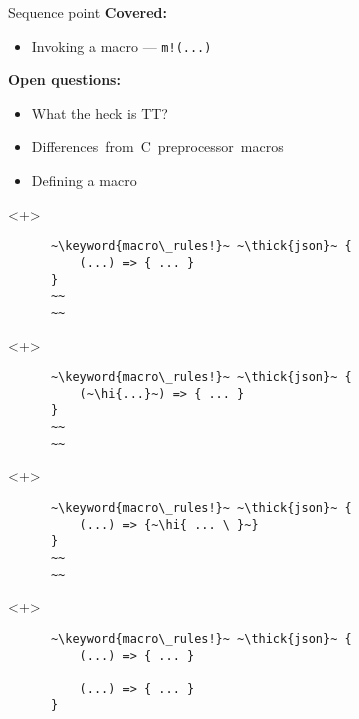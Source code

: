 \documentclass[usepdftitle=false]{beamer}
\newcommand{\thick}[1]{\contourlength{0.16pt}\contour[10]{black}{#1}}
\newcommand{\hi}[1]{%
\tikz[baseline=(A.base)]
 \node[highlighting=yellowbg,inner sep=0pt,text depth=0pt] (A) {#1};%
}
\newcommand{\keyword}[1]{\color{greenish}#1}
\begin{document}
\begin{frame}[fragile]{Sequence point}
  \setlength{\leftmargini}{40pt}
  \vspace{10pt}
  \textbf{\large Covered:}
  \begin{itemize}[label=\footnotesize{},labelsep=10pt]
  \vspace{-4pt}
  \item Invoking a macro --- \texttt{m!(...)}
  \end{itemize}
  \vspace{10pt}
  \textbf{\large Open questions:}
  \begin{itemize}[label=\footnotesize{},labelsep=10pt]
  \vspace{-4pt}
  \item What the heck is TT?
  \vspace{-4pt}
  \item \mbox{Differences from C preprocessor macros\hspace*{-1000pt}}
  \vspace{-4pt}
  \item Defining a macro
  \end{itemize}
\end{frame}

\begin{frame}[fragile]
  \begin{onlyenv}<+>
    \begin{verbatim}
      ~\keyword{macro\_rules!}~ ~\thick{json}~ {
          (...) => { ... }
      }
      ~~
      ~~
    \end{verbatim}
  \end{onlyenv}
  \begin{onlyenv}<+>
    \begin{verbatim}
      ~\keyword{macro\_rules!}~ ~\thick{json}~ {
          (~\hi{...}~) => { ... }
      }
      ~~
      ~~
    \end{verbatim}
  \end{onlyenv}
  \begin{onlyenv}<+>
    \begin{verbatim}
      ~\keyword{macro\_rules!}~ ~\thick{json}~ {
          (...) => {~\hi{ ... \ }~}
      }
      ~~
      ~~
    \end{verbatim}
  \end{onlyenv}
  \begin{onlyenv}<+>
    \begin{verbatim}
      ~\keyword{macro\_rules!}~ ~\thick{json}~ {
          (...) => { ... }

          (...) => { ... }
      }
    \end{verbatim}
  \end{onlyenv}
\end{frame}
\end{document}
